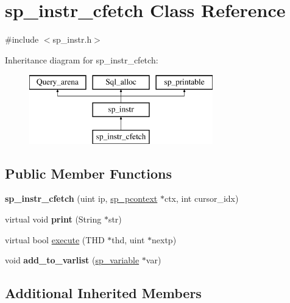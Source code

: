 \hypertarget{classsp__instr__cfetch}{}\section{sp\+\_\+instr\+\_\+cfetch Class Reference}
\label{classsp__instr__cfetch}


{\ttfamily \#include $<$sp\+\_\+instr.\+h$>$}

Inheritance diagram for sp\+\_\+instr\+\_\+cfetch\+:\begin{figure}[H]
\begin{center}
\leavevmode
\includegraphics[height=3.000000cm]{classsp__instr__cfetch}
\end{center}
\end{figure}
\subsection*{Public Member Functions}
\begin{DoxyCompactItemize}
\item 
\mbox{\label{classsp__instr__cfetch_a7c58ea72308a5e4f02bd8ac5a7ad1bd7}} 
{\bfseries sp\+\_\+instr\+\_\+cfetch} (uint ip, \mbox{\hyperlink{classsp__pcontext}{sp\+\_\+pcontext}} $\ast$ctx, int cursor\+\_\+idx)
\item 
\mbox{\label{classsp__instr__cfetch_ab11fbd41e1d040d756afbf8c085a817f}} 
virtual void {\bfseries print} (String $\ast$str)
\item 
virtual bool \mbox{\hyperlink{classsp__instr__cfetch_a10a1b6c9bbf720a85ccce90f7163aed1}{execute}} (T\+HD $\ast$thd, uint $\ast$nextp)
\item 
\mbox{\label{classsp__instr__cfetch_aeb6ebbcde4f790b7827da67fbb1cdf9b}} 
void {\bfseries add\+\_\+to\+\_\+varlist} (\mbox{\hyperlink{classsp__variable}{sp\+\_\+variable}} $\ast$var)
\end{DoxyCompactItemize}
\subsection*{Additional Inherited Members}


